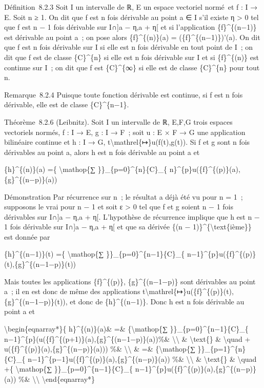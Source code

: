 \documentclass[]{article}
\begin{document}
Définition~8.2.3 Soit I un intervalle de ℝ, E un espace vectoriel
normé~et f : I → E. Soit n ≥ 1. On dit que f est n fois dérivable au
point a ∈ I s'il existe η \textgreater{} 0 tel que f est n − 1 fois
dérivable sur I∩{]}a − η,a + η{[} et si l'application \{f\}\^{}\{(n−1)\}
est dérivable au point a~; on pose alors \{f\}\^{}\{(n)\}(a) =
(\{f\}\^{}\{(n−1)\})'(a). On dit que f est n fois dérivable sur I si
elle est n fois dérivable en tout point de I~; on dit que f est de
classe \{C\}\^{}\{n\} si elle est n fois dérivable sur I et si
\{f\}\^{}\{(n)\} est continue sur I~; on dit que f est \{C\}\^{}\{∞\} si
elle est de classe \{C\}\^{}\{n\} pour tout n.

Remarque~8.2.4 Puisque toute fonction dérivable est continue, si f est n
fois dérivable, elle est de classe \{C\}\^{}\{n−1\}.

Théorème~8.2.6 (Leibnitz). Soit I un intervalle de ℝ, E,F,G trois
espaces vectoriels normés, f : I → E, g : I → F~; soit u : E × F → G une
application bilinéaire continue et h : I → G,
t\textbackslash{}mathrel\{↦\}u(f(t),g(t)). Si f et g sont n fois
dérivables au point a, alors h est n fois dérivable au point a et

\{h\}\^{}\{(n)\}(a) =\{ \textbackslash{}mathop\{∑
\}\}\_\{p=0\}\^{}\{n\}\{C\}\_\{
n\}\^{}\{p\}u(\{f\}\^{}\{(p)\}(a),\{g\}\^{}\{(n−p)\}(a))

Démonstration Par récurrence sur n~; le résultat a déjà été vu pour n =
1~; supposons le vrai pour n − 1 et soit ε \textgreater{} 0 tel que f et
g soient n − 1 fois dérivables sur I∩{]}a − η,a + η{[}. L'hypothèse de
récurrence implique que h est n − 1 fois dérivable sur I∩{]}a − η,a +
η{[} et que sa dérivée \{(n − 1)\}\^{}\{\textbackslash{}text\{ième\}\}
est donnée par

\{h\}\^{}\{(n−1)\}(t) =\{ \textbackslash{}mathop\{∑
\}\}\_\{p=0\}\^{}\{n−1\}\{C\}\_\{
n−1\}\^{}\{p\}u(\{f\}\^{}\{(p)\}(t),\{g\}\^{}\{(n−1−p)\}(t))

Mais toutes les applications \{f\}\^{}\{(p)\}, \{g\}\^{}\{(n−1−p)\} sont
dérivables au point a~; il en est donc de même des applications
t\textbackslash{}mathrel\{↦\}u(\{f\}\^{}\{(p)\}(t),\{g\}\^{}\{(n−1−p)\}(t)),
et donc de \{h\}\^{}\{(n−1)\}. Donc h est n fois dérivable au point a et

\textbackslash{}begin\{eqnarray*\}\{ h\}\^{}\{(n)\}(a)\& =\&
\{\textbackslash{}mathop\{∑ \}\}\_\{p=0\}\^{}\{n−1\}\{C\}\_\{
n−1\}\^{}\{p\}(u(\{f\}\^{}\{(p+1)\}(a),\{g\}\^{}\{(n−1−p)\}(a))\%\&
\textbackslash{}\textbackslash{} \& \textbackslash{}text\{\} \&
\textbackslash{}quad + u(\{f\}\^{}\{(p)\}(a),\{g\}\^{}\{(n−p)\}(a)))
\%\& \textbackslash{}\textbackslash{} \& =\& \{\textbackslash{}mathop\{∑
\}\}\_\{p=1\}\^{}\{n\}\{C\}\_\{
n−1\}\^{}\{p−1\}u(\{f\}\^{}\{(p)\}(a),\{g\}\^{}\{(n−p)\}(a)) \%\&
\textbackslash{}\textbackslash{} \& \textbackslash{}text\{\} \&
\textbackslash{}quad +\{ \textbackslash{}mathop\{∑
\}\}\_\{p=0\}\^{}\{n−1\}\{C\}\_\{
n−1\}\^{}\{p\}u(\{f\}\^{}\{(p)\}(a),\{g\}\^{}\{(n−p)\}(a)) \%\&
\textbackslash{}\textbackslash{} \textbackslash{}end\{eqnarray*\}
\end{document}
